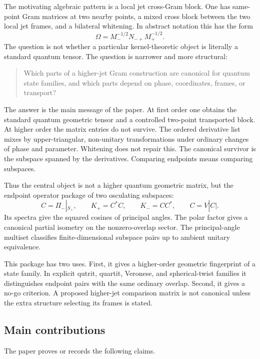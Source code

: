 \documentclass[11pt]{amsart}
\newcommand{\Proj}{\Pi}
\begin{document}
The motivating algebraic pattern is a local jet cross-Gram block. One has
same-point Gram matrices at two nearby points, a mixed cross block between the
two local jet frames, and a bilateral whitening. In abstract notation this has
the form
\[
        \Omega=M_-^{-1/2}N_{-+}M_+^{-1/2}.
\]
The question is not whether a particular kernel-theoretic object is literally a
standard quantum tensor. The question is narrower and more structural:

\begin{quote}
Which parts of a higher-jet Gram construction are canonical for quantum state
families, and which parts depend on phase, coordinates, frames, or transport?
\end{quote}

The answer is the main message of the paper. At first order one obtains the
standard quantum geometric tensor and a controlled two-point transported block.
At higher order the matrix entries do not survive. The ordered derivative list
mixes by upper-triangular, non-unitary transformations under ordinary changes
of phase and parameter. Whitening does not repair this. The canonical survivor
is the subspace spanned by the derivatives. Comparing endpoints means comparing
subspaces.

Thus the central object is not a higher quantum geometric matrix, but the
endpoint operator package of two osculating subspaces:
\[
        C=\Proj_-|_{S_+},\qquad K_+=C^*C,\qquad
        K_-=CC^*,\qquad C=V|C|.
\]
Its spectra give the squared cosines of principal angles. The polar factor
gives a canonical partial isometry on the nonzero-overlap sector. The
principal-angle multiset classifies finite-dimensional subspace pairs up to
ambient unitary equivalence.

This package has two uses. First, it gives a higher-order geometric fingerprint
of a state family. In explicit qutrit, quartit, Veronese, and spherical-twist
families it distinguishes endpoint pairs with the same ordinary overlap.
Second, it gives a no-go criterion. A proposed higher-jet comparison matrix is
not canonical unless the extra structure selecting its frames is stated.

\subsection{Main contributions}

The paper proves or records the following claims.
\end{document}

